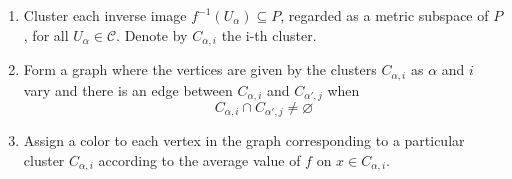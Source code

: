 \begin{enumerate}
  \item Cluster each inverse image $f^{-1}(U_{\alpha}) \subseteq P$, regarded as a metric subspace of $P$, for all $U_{\alpha} \in \mathcal{C}$. Denote by $C_{\alpha, i}$ the i-th cluster.

  \item Form a graph where the vertices are given by the clusters $C_{\alpha, i}$ as $\alpha$ and $i$ vary and there is an edge between $C_{\alpha, i}$ and $C_{\alpha', j}$ when
        \begin{equation*}
          C_{\alpha, i} \cap C_{\alpha', j} \neq \varnothing
        \end{equation*}

  \item Assign a color to each vertex in the graph corresponding to a particular cluster $C_{\alpha, i}$ according to the average value of $f$ on $x \in C_{\alpha, i}$.
\end{enumerate}
